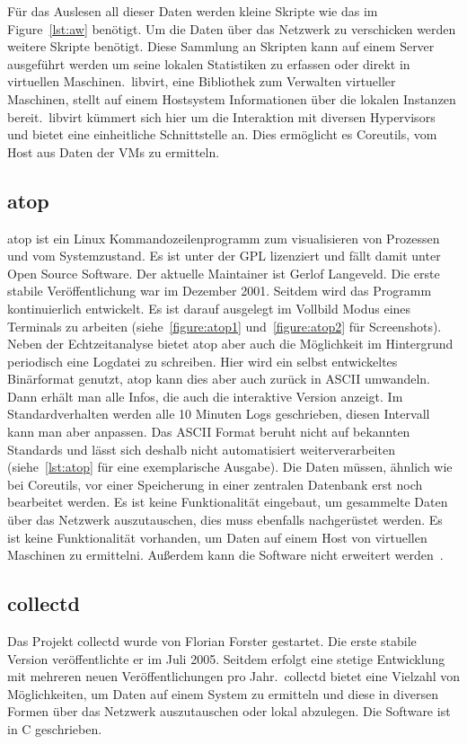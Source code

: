 Für das Auslesen all dieser Daten werden kleine Skripte wie das im
Figure~\ref{lst:aw} benötigt. Um die Daten über das Netzwerk zu verschicken
werden weitere Skripte benötigt. Diese Sammlung an Skripten kann auf einem
Server ausgeführt werden um seine lokalen Statistiken zu erfassen oder direkt
in virtuellen Maschinen.\ libvirt, eine Bibliothek zum Verwalten virtueller
Maschinen, stellt auf einem Hostsystem Informationen über die lokalen Instanzen
bereit.\ libvirt kümmert sich hier um die Interaktion mit diversen Hypervisors
und bietet eine einheitliche Schnittstelle an. Dies ermöglicht es Coreutils,
vom Host aus Daten der VMs zu ermitteln.
\tm%

\subsection{atop}
atop ist ein Linux Kommandozeilenprogramm zum visualisieren von Prozessen und
vom Systemzustand. Es ist unter der GPL lizenziert und fällt damit unter Open
Source Software. Der aktuelle \gls{Maintainer} ist Gerlof Langeveld. Die erste
stabile Veröffentlichung war im Dezember 2001. Seitdem wird das Programm
kontinuierlich entwickelt. Es ist darauf ausgelegt im Vollbild Modus eines
Terminals zu arbeiten (siehe~\ref{figure:atop1} und~\ref{figure:atop2} für
Screenshots). Neben der Echtzeitanalyse bietet atop aber auch die Möglichkeit
im Hintergrund periodisch eine Logdatei zu schreiben. Hier wird ein selbst
entwickeltes Binärformat genutzt, atop kann dies aber auch zurück in ASCII
umwandeln. Dann erhält man alle Infos, die auch die interaktive Version
anzeigt. Im Standardverhalten werden alle 10 Minuten Logs geschrieben, diesen
Intervall kann man aber anpassen. Das ASCII Format beruht nicht auf bekannten
Standards und lässt sich deshalb nicht automatisiert weiterverarbeiten
(siehe~\ref{lst:atop} für eine exemplarische Ausgabe). Die Daten müssen,
ähnlich wie bei Coreutils, vor einer Speicherung in einer zentralen Datenbank
erst noch bearbeitet werden. Es ist keine Funktionalität eingebaut, um
gesammelte Daten über das Netzwerk auszutauschen, dies muss ebenfalls
nachgerüstet werden. Es ist keine Funktionalität vorhanden, um Daten auf einem
Host von virtuellen Maschinen zu ermittelni. Außerdem kann die Software nicht
erweitert werden~\cite{atop}.
\tm%

\subsection{collectd}
Das Projekt collectd wurde von Florian Forster gestartet. Die erste stabile
Version veröffentlichte er im Juli 2005. Seitdem erfolgt eine stetige
Entwicklung mit mehreren neuen Veröffentlichungen pro Jahr.\ collectd bietet
eine Vielzahl von Möglichkeiten, um Daten auf einem System zu ermitteln und
diese in diversen Formen über das Netzwerk auszutauschen oder lokal abzulegen.
Die Software ist in C geschrieben.

